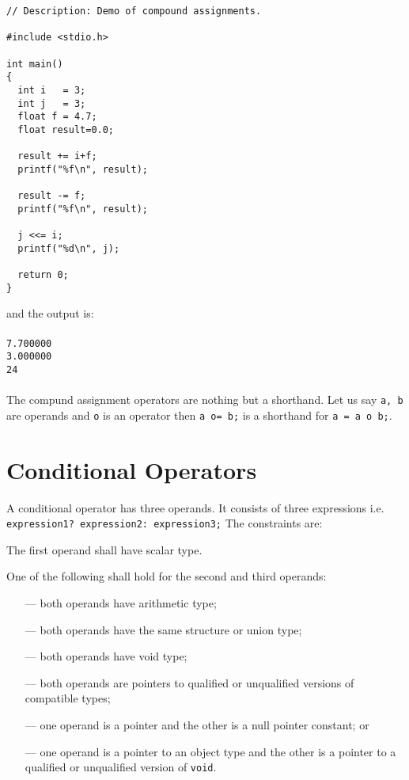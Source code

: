 \begin{verbatim}
// Description: Demo of compound assignments.

#include <stdio.h>

int main()
{
  int i   = 3;
  int j   = 3;
  float f = 4.7;
  float result=0.0;

  result += i+f;
  printf("%f\n", result);

  result -= f;
  printf("%f\n", result);

  j <<= i;
  printf("%d\n", j);

  return 0;
}
\end{verbatim}

and the output is:
\\\\\texttt{7.700000\\
3.000000\\
24\\\\}
The compund assignment operators are nothing but a shorthand. Let us say
\texttt{a, b} are operands and \texttt{o} is an operator then \texttt{a o= b;}
is a shorthand for \texttt{a = a o b;}.

\section{Conditional Operators}
A conditional operator has three operands. It consists of three
expressions i.e. \texttt{expression1? expression2: expression3;} The
constraints are:

The first operand shall have scalar type.

One of the following shall hold for the second and third operands:
\begin{itemize}
\item[---] both operands have arithmetic type;
\item[---] both operands have the same structure or union type;
\item[---] both operands have void type;
\item[---] both operands are pointers to qualified or unqualified versions of
  compatible types;
\item[---] one operand is a pointer and the other is a null pointer constant;
  or
\item[---] one operand is a pointer to an object type and the other is a
  pointer to a qualified or unqualified version of \texttt{void}.
\end{itemize}

